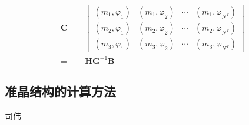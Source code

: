 \begin{equation*}
\begin{aligned}
\mathbf C =& \begin{bmatrix}
(m_1, \varphi_1) & (m_1, \varphi_2) & \cdots & (m_1, \varphi_{N^{V}}) \\
(m_2, \varphi_1) & (m_2, \varphi_2) & \cdots & (m_2, \varphi_{N^{V}})\\
(m_{3}, \varphi_1) & (m_{3}, \varphi_2) & \cdots & (m_{3},\varphi_{N^{V}})
\end{bmatrix}\\
= & \mathbf H\mathbf G^{-1}\mathbf B
\end{aligned}
\end{equation*}


\subsection{准晶结构的计算方法}
{\color{red}\begin{center}
    司伟
\end{center}}
